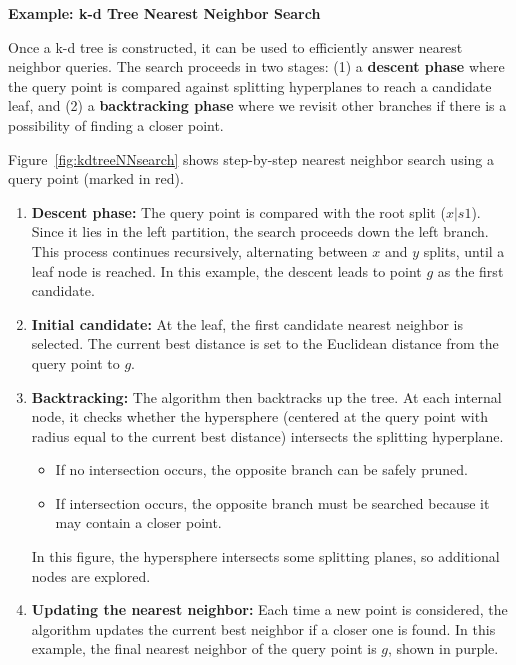 \documentclass[12pt]{book}
\begin{document}
\begin{enumerate}
    \textbf{Example: k-d Tree Nearest Neighbor Search}

Once a k-d tree is constructed, it can be used to efficiently answer nearest neighbor queries.  
The search proceeds in two stages: 
(1) a \textbf{descent phase} where the query point is compared against splitting hyperplanes to reach a candidate leaf, and  
(2) a \textbf{backtracking phase} where we revisit other branches if there is a possibility of finding a closer point.  

Figure~\ref{fig:kdtreeNNsearch} shows step-by-step nearest neighbor search using a query point (marked in red).  

\begin{enumerate}
    \item \textbf{Descent phase:}  
    The query point is compared with the root split ($x|s1$). Since it lies in the left partition, the search proceeds down the left branch. This process continues recursively, alternating between $x$ and $y$ splits, until a leaf node is reached. In this example, the descent leads to point $g$ as the first candidate.
    
    \item \textbf{Initial candidate:}  
    At the leaf, the first candidate nearest neighbor is selected. The current best distance is set to the Euclidean distance from the query point to $g$.
    
    \item \textbf{Backtracking:}  
    The algorithm then backtracks up the tree. At each internal node, it checks whether the hypersphere (centered at the query point with radius equal to the current best distance) intersects the splitting hyperplane.  
    \begin{itemize}
        \item If no intersection occurs, the opposite branch can be safely pruned.  
        \item If intersection occurs, the opposite branch must be searched because it may contain a closer point.  
    \end{itemize}
    In this figure, the hypersphere intersects some splitting planes, so additional nodes are explored.
    
    \item \textbf{Updating the nearest neighbor:}  
    Each time a new point is considered, the algorithm updates the current best neighbor if a closer one is found. In this example, the final nearest neighbor of the query point is $g$, shown in purple.
\end{enumerate}


\end{enumerate}
\end{document}

